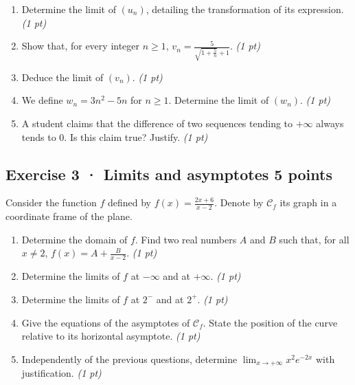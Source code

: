 \begin{enumerate}

\item Determine the limit of $(u_n)$, detailing the transformation of its expression. \hfill\textit{(1 pt)}

\item Show that, for every integer $n\ge1$, $v_n=\frac{5}{\sqrt{1+\frac{5}n}+1}$. \hfill\textit{(1 pt)}

\item Deduce the limit of $(v_n)$. \hfill\textit{(1 pt)}

\item We define $w_n=3n^2-5n$ for $n\ge1$. Determine the limit of $(w_n)$. \hfill\textit{(1 pt)}

\item A student claims that the difference of two sequences tending to $+\infty$ always tends to $0$. Is this claim true? Justify. \hfill\textit{(1 pt)}

\end{enumerate}

\mxnewpage{}

\subsection*{Exercise 3 · Limits and asymptotes \hfill 5 points}Consider the function $f$ defined by $f(x)=\frac{2x+6}{x-2}$. Denote by $\mathcal C_f$ its graph in a coordinate frame of the plane.

\begin{enumerate}

\item Determine the domain of $f$. Find two real numbers $A$ and $B$ such that, for all $x\ne2$, $f(x)=A+\frac B{x-2}$. \hfill\textit{(1 pt)}

\item Determine the limits of $f$ at $-\infty$ and at $+\infty$. \hfill\textit{(1 pt)}

\item Determine the limits of $f$ at $2^-$ and at $2^+$. \hfill\textit{(1 pt)}

\item Give the equations of the asymptotes of $\mathcal C_f$. State the position of the curve relative to its horizontal asymptote. \hfill\textit{(1 pt)}

\item Independently of the previous questions, determine $\displaystyle\lim_{x\to+\infty}x^{2}e^{-2x}$ with justification. \hfill\textit{(1 pt)}

\end{enumerate}

